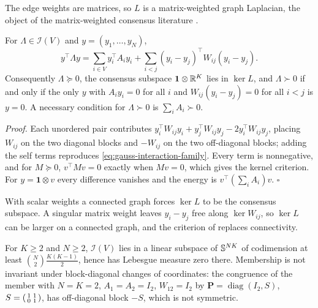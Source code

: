 The edge weights are matrices, so \(L\) is a matrix-weighted graph Laplacian,
the object of the matrix-weighted consensus literature
\citep{Trinh2018MatrixWeighted}.

For \(\Lambda\in\mathcal I(V)\) and \(y=(y_1,\dots,y_N)\),
\begin{equation}
y^\top\Lambda y
=\sum_{i\in V}y_i^\top A_iy_i
+\sum_{i<j}\left(y_i-y_j\right)^\top W_{ij}\left(y_i-y_j\right).
\label{eq:gauss-interaction-energy}
\end{equation}
Consequently \(\Lambda\succeq0\), the consensus subspace
\(\mathbf 1\otimes\mathbb R^{K}\) lies in \(\ker L\), and \(\Lambda\succ0\) if and only
if the only \(y\) with \(A_iy_i=0\) for all \(i\) and
\(W_{ij}(y_i-y_j)=0\) for all \(i<j\) is \(y=0\). A necessary condition for
\(\Lambda\succ0\) is \(\sum_iA_i\succ0\). 

\noindent\emph{Proof.}
Each unordered pair contributes
\(y_i^\top W_{ij}y_i+y_j^\top W_{ij}y_j-2y_i^\top W_{ij}y_j\), placing \(W_{ij}\)
on the two diagonal blocks and \(-W_{ij}\) on the two off-diagonal blocks;
adding the self terms reproduces \eqref{eq:gauss-interaction-family}. Every
term is nonnegative, and for \(M\succeq0\), \(v^\top Mv=0\) exactly when
\(Mv=0\), which gives the kernel criterion. For \(y=\mathbf 1\otimes v\) every
difference vanishes and the energy is \(v^\top(\sum_iA_i)v\). \(\square\)

With scalar weights a connected graph forces \(\ker L\) to be the consensus
subspace. A singular matrix weight leaves \(y_i-y_j\) free along
\(\ker W_{ij}\), so \(\ker L\) can be larger on a connected graph, and the
criterion of  replaces
connectivity.

For \(K\geq2\) and \(N\geq2\), \(\mathcal I(V)\) lies in a linear subspace of
\(\mathbb S^{NK}\) of codimension at least \(\binom N2\tfrac{K(K-1)}{2}\), hence has
Lebesgue measure zero there. Membership is not invariant under block-diagonal
changes of coordinates: the congruence of the member with \(N=K=2\),
\(A_1=A_2=I_2\), \(W_{12}=I_2\) by
\(\mathbf P=\operatorname{diag}(I_2,S)\),
\(S=\begin{psmallmatrix}1&1\\0&1\end{psmallmatrix}\), has off-diagonal block
\(-S\), which is not symmetric. 

